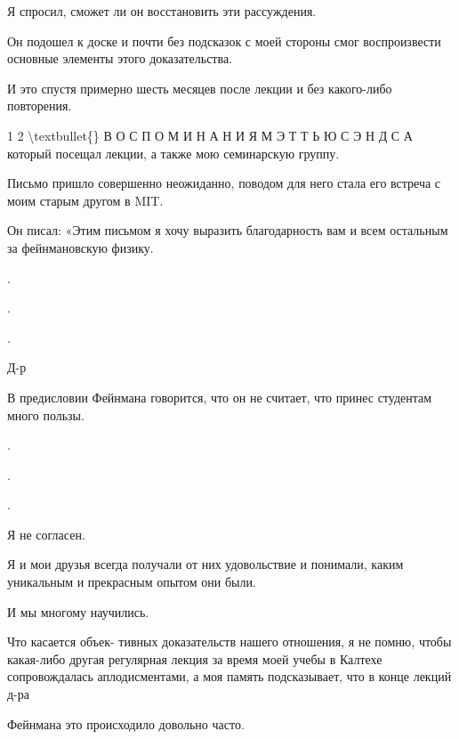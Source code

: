 \documentclass[10pt,oneside]{article}
\begin{document}
Я спросил, сможет ли он восстановить эти рассуждения.\par

Он подошел к доске и почти без подсказок с моей стороны смог воспроизвести основные элементы этого доказательства.\par

И это спустя примерно шесть месяцев после лекции и без какого-либо повторения.\par

1 2 \textbackslash{}textbullet\{\} В О С П О М И Н А Н И Я  М Э Т Т Ь Ю  С Э Н Д С А который посещал лекции, а также мою семинарскую группу.\par

Письмо пришло совершенно неожиданно, поводом для него стала его встреча с моим старым другом в MIT.\par

Он писал: «Этим письмом я хочу выразить благодарность вам и всем остальным за фейнмановскую физику.\par

.\par

.\par

.\par

Д-р\par

В предисловии Фейнмана говорится, что он не считает, что принес студентам много пользы.\par

.\par

.\par

.\par

Я не согласен.\par

Я и мои друзья всегда получали от них удовольствие и понимали, каким уникальным и прекрасным опытом они были.\par

И мы многому научились.\par

Что касается объек- тивных доказательств нашего отношения, я не помню, чтобы какая-либо другая регулярная лекция за время моей учебы в Калтехе сопровождалась аплодисментами, а моя память подсказывает, что в конце лекций д-ра\par

Фейнмана это происходило довольно часто.\par
\end{document}
